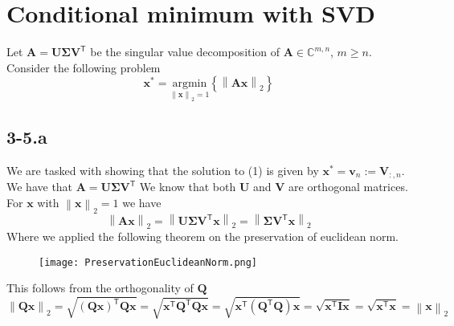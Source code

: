 \documentclass{article}
\begin{document}
\section*{Conditional minimum with SVD}
Let $\mathbf{A} = \mathbf{U}\mathbf{\Sigma}\mathbf{V}^{\mathsf{T}}$ be the singular value decomposition of $\mathbf{A}\in \mathbb{C}^{m,n}$, $m \geq n$. Consider the following problem
\begin{equation}
    \mathbf{x}^{*} = \underset{\left\lVert \mathbf{x}\right\rVert_{2} = 1}{\text{argmin}}\left\{\left\lVert \mathbf{A}\mathbf{x}\right\rVert_{2}\right\}
\end{equation}
\subsection*{3-5.a} 
We are tasked with showing that the solution to (1) is given by $\mathbf{x}^{*} = \mathbf{v}_{n} := \mathbf{V}_{:,n}$. We have that $\mathbf{A} = \mathbf{U}\mathbf{\Sigma}\mathbf{V}^{\mathsf{T}}$ We know that both $\mathbf{U}$ and $\mathbf{V}$ are orthogonal matrices. For $\mathbf{x}$ with $\left\lVert \mathbf{x}\right\rVert_{2} = 1$ we have
\begin{equation*}
    \left\lVert \mathbf{A}\mathbf{x}\right\rVert_{2} = \left\lVert \mathbf{U}\mathbf{\Sigma}\mathbf{V}^{\mathsf{T}}\mathbf{x}\right\rVert_{2} = \left\lVert \mathbf{\Sigma}\mathbf{V}^{\mathsf{T}}\mathbf{x}\right\rVert_{2} 
\end{equation*}
Where we applied the following theorem on the preservation of euclidean norm.

\begin{figure}[!hbt]
    \centering
\texttt{[image: PreservationEuclideanNorm.png]}
\end{figure}

\noindent This follows from the orthogonality of $\mathbf{Q}$
\begin{equation*}
    \left\lVert \mathbf{Q}\mathbf{x}\right\rVert_{2} = \sqrt{\left(\mathbf{Q}\mathbf{x}\right)^{\mathsf{T}}\mathbf{Q}\mathbf{x}} = \sqrt{\mathbf{x}^{\mathsf{T}}\mathbf{Q}^{\mathsf{T}}\mathbf{Q}\mathbf{x}}  = \sqrt{\mathbf{x}^{\mathsf{T}}\left(\mathbf{Q}^{\mathsf{T}}\mathbf{Q}\right)\mathbf{x}} =\sqrt{\mathbf{x}^{\mathsf{T}}\mathbf{I}\mathbf{x}}
=\sqrt{\mathbf{x}^{\mathsf{T}}\mathbf{x}} = \left\lVert \mathbf{x}\right\rVert_{2}
\end{equation*}
\end{document}
